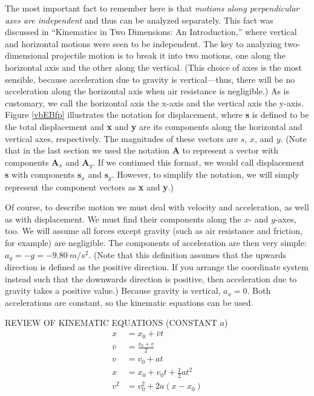 \documentclass[../../main-ap-physics.tex]{subfiles}
\begin{document}
The most important fact to remember here is that \textit{motions along perpendicular axes are independent} and thus can be analyzed separately. This fact was discussed in ``Kinematics in Two Dimensions: An Introduction,'' where vertical and horizontal motions were seen to be independent. The key to analyzing two-dimensional projectile motion is to break it into two motions, one along the horizontal axis and the other along the vertical. (This choice of axes is the most sensible, because acceleration due to gravity is vertical---thus, there will be no acceleration along the horizontal axis when air resistance is negligible.) As is customary, we call the horizontal axis the x-axis and the vertical axis the y-axis. Figure \ref{vbEBfp} illustrates the notation for displacement, where \textbf{s} is defined to be the total displacement and \textbf{x} and \textbf{y} are its components along the horizontal and vertical axes, respectively. The magnitudes of these vectors are $s$, $x$, and $y$. (Note that in the last section we used the notation \textbf{A} to represent a vector with components $\textbf{A}_x$ and $\textbf{A}_y$. If we continued this format, we would call displacement \textbf{s} with components $\textbf{s}_x$ and $\textbf{s}_y$. However, to simplify the notation, we will simply represent the component vectors as \textbf{x} and \textbf{y}.)

\vspace{1em}

Of course, to describe motion we must deal with velocity and acceleration, as well as with displacement. We must find their components along the $x$- and $y$-axes, too. We will assume all forces except gravity (such as air resistance and friction, for example) are negligible. The components of acceleration are then very simple: $a_y = -g = -\SI{9.80}{m/s^2}$. (Note that this definition assumes that the upwards direction is defined as the positive direction. If you arrange the coordinate system instead such that the downwards direction is positive, then acceleration due to gravity takes a positive value.) Because gravity is vertical, $a_x = 0$. Both accelerations are constant, so the kinematic equations can be used.

\begin{gradient}{REVIEW OF KINEMATIC EQUATIONS (CONSTANT $a$)}
\vspace{-1em}
    \begin{align}
        x &= x_0 + \bar{v} t \\[1ex]
        \bar{v} &= \frac{v_0 + v}{2} \\[1ex]
        v &= v_0 + a t \\[1ex]
        x &= x_0 + v_0 t + \frac{1}{2} a t^2 \\[1ex]
        v^2 &= v_0^2 + 2 a \left(x - x_0\right)
    \end{align}
\vspace{-1em}
\end{gradient}
\end{document}
